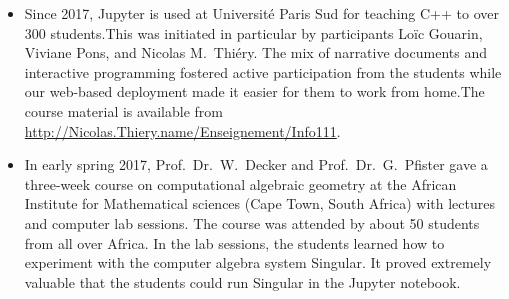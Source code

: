 \begin{Aim 1}
\begin{Aim 2}
\begin{itemize}
Women in sage workshops
    Last January, Viviane Pons, Jessica Striker and Jennifer Balakrishnan organized the first WomenInSage event in Europe with OpenDreamKit.      
    20 women spent a week together coding and learning in a rented house in the Paris area.
    We took advantage of the diverse knowledge background of our group to work together and learn from each other. It was an occasion for 
    many "first times" among participants who had very little experience with Sage:

    5 participants installed a source version of Sage for the first time (so that they could edit the source).
    3 used git for the first time.
    5 used git within Sage for the first time.
    11 got their first Trac account .
    5 got their first contribution to a Sage ticket.
    8 are in the process of getting their first code integrated to Sage.

We worked on 14 tickets during the week, 6 of those which have been merged since the conference. All participants said they had learned new things and it would impact their careers. %

\subsection{Teaching}\label{teaching}
We showcase here a few of the many uses in teaching of the Jupyter kernels we contributed to:

     \item Since 2017, Jupyter is used at Université Paris Sud for teaching C++ to over 300 students.This was initiated in particular by
     \ODK participants Loïc Gouarin, Viviane Pons, and Nicolas M.\ Thiéry. The mix of narrative documents and interactive programming 
     fostered active participation from the students while our web-based deployment made it easier for them to work from home.The course 
     material is available from \url{http://Nicolas.Thiery.name/Enseignement/Info111}.
     
     \item In early spring 2017, Prof.~Dr.~W.~Decker and Prof.~Dr.~G.~Pfister gave a three-week course on computational algebraic geometry 
     at the African Institute for Mathematical sciences (Cape Town, South Africa) with lectures and computer lab sessions.
     The course was attended by about 50 students from all over Africa. In the lab sessions, the students learned how to experiment with the
     computer algebra system Singular. It proved extremely valuable that the students could run Singular in the Jupyter notebook.
     

\end{itemize}
\end{Aim 2}
\end{Aim 1}
